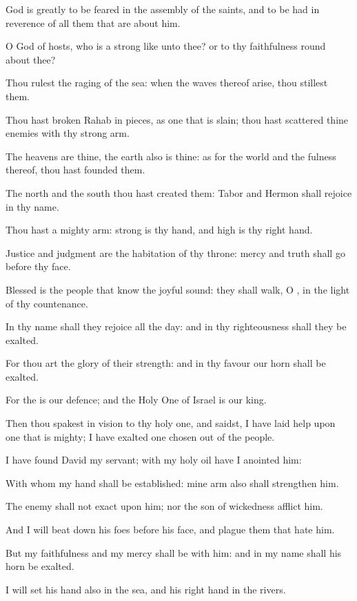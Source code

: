 \verse God is greatly to be feared in the assembly of the saints, and to be had in reverence of all them that are about him.

\verse O \LORD God of hosts, who is a strong \LORD like unto thee? or to thy faithfulness round about thee?

\verse Thou rulest the raging of the sea: when the waves thereof arise, thou stillest them.

\verse Thou hast broken Rahab in pieces, as one that is slain; thou hast scattered thine enemies with thy strong arm.

\verse The heavens are thine, the earth also is thine: as for the world and the fulness thereof, thou hast founded them.

\verse The north and the south thou hast created them: Tabor and Hermon shall rejoice in thy name.

\verse Thou hast a mighty arm: strong is thy hand, and high is thy right hand.

\verse Justice and judgment are the habitation of thy throne: mercy and truth shall go before thy face.

\verse Blessed is the people that know the joyful sound: they shall walk, O \LORD, in the light of thy countenance.

\verse In thy name shall they rejoice all the day: and in thy righteousness shall they be exalted.

\verse For thou art the glory of their strength: and in thy favour our horn shall be exalted.

\verse For the \LORD is our defence; and the Holy One of Israel is our king.

\verse Then thou spakest in vision to thy holy one, and saidst, I have laid help upon one that is mighty; I have exalted one chosen out of the people.

\verse I have found David my servant; with my holy oil have I anointed him:

\verse With whom my hand shall be established: mine arm also shall strengthen him.

\verse The enemy shall not exact upon him; nor the son of wickedness afflict him.

\verse And I will beat down his foes before his face, and plague them that hate him.

\verse But my faithfulness and my mercy shall be with him: and in my name shall his horn be exalted.

\verse I will set his hand also in the sea, and his right hand in the rivers.

